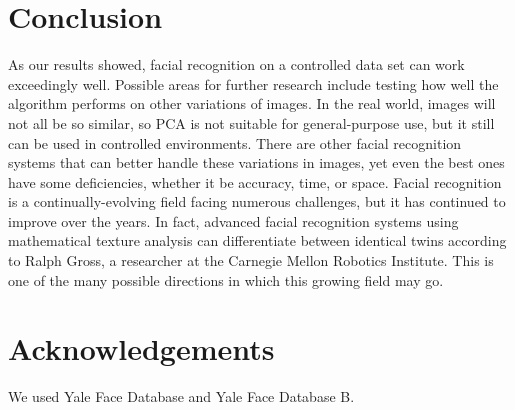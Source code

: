 \documentclass[letterpaper]{article}
\begin{document}
\section{Conclusion}
As our results showed, facial recognition on a controlled data set can work exceedingly well. Possible areas for further research include testing how well the algorithm performs on other variations of images.  In the real world, images will not all be so similar, so PCA is not suitable for general-purpose use, but it still can be used in controlled environments.  There are other facial recognition systems that can better handle these variations in images, yet even the best ones have some deficiencies, whether it be accuracy, time, or space.  Facial recognition is a continually-evolving field facing numerous challenges, but it has continued to improve over the years.  In fact, advanced facial recognition systems using mathematical texture analysis can differentiate between identical twins according to Ralph Gross, a researcher at the Carnegie Mellon Robotics Institute. This is one of the many possible directions in which this growing field may go.
\section{Acknowledgements}
We used Yale Face Database and Yale Face Database B.


\end{document}
